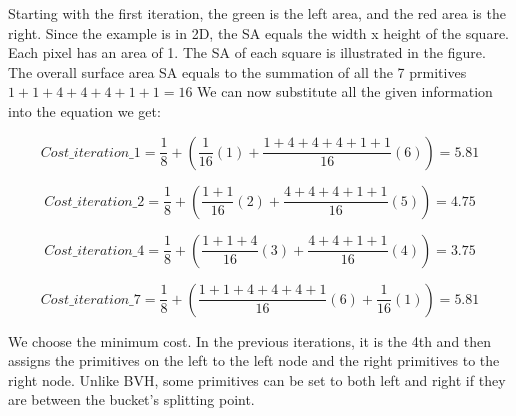 \documentclass[11pt,a4paper]{article}
\begin{document}
Starting with the first iteration, the green is the left area, and the red area is the right. Since the example is in 2D, the SA equals the width x height of the square. Each pixel has an area of 1. The SA of each square is illustrated in the figure. The overall surface area SA equals to the summation of all the 7 prmitives $1+1+4+4+4+1+1 = 16$ We can now substitute all the given information into the equation we get: 


\begin{equation}
Cost\_iteration\_1 =  \frac{1}{8} + (\frac{1}{16}(1) +\frac{1+4+4+4+1+1}{16}(6)) = 5.81
\end{equation}

\begin{equation}
Cost\_iteration\_2 =  \frac{1}{8} + (\frac{1+1}{16}(2) +\frac{4+4+4+1+1}{16}(5)) = 4.75
\end{equation}

\begin{equation}
Cost\_iteration\_4 =  \frac{1}{8} + (\frac{1+1+4}{16}(3) +\frac{4+4+1+1}{16}(4)) = 3.75
\end{equation}

\begin{equation}
Cost\_iteration\_7 =  \frac{1}{8} + (\frac{1+1+4+4+4+1}{16}(6) +\frac{1}{16}(1)) = 5.81
\end{equation}


We choose the minimum cost. In the previous iterations, it is the 4th and then assigns the primitives on the left to the left node and the right primitives to the right node. Unlike BVH, some primitives can be set to both left and right if they are between the bucket's splitting point.
\end{document}
